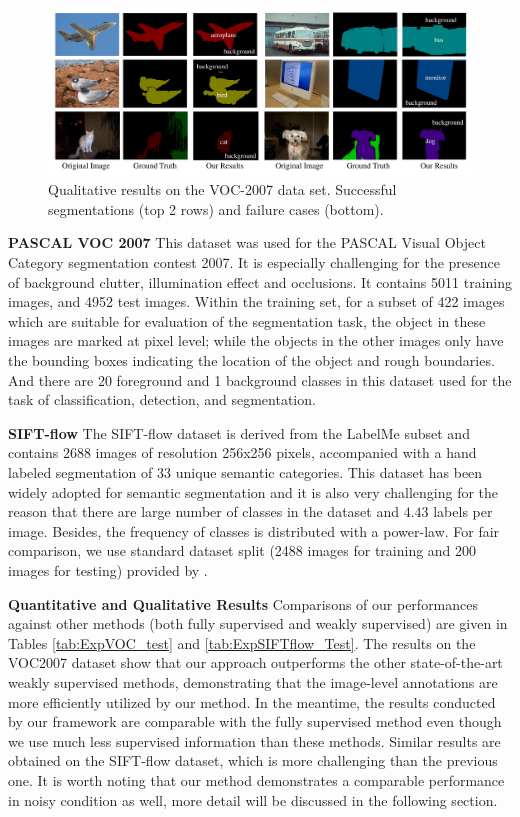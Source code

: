 \begin{figure}
\begin{center}
    \includegraphics[width=0.9\linewidth]{Fig_VOC.pdf}
\end{center}
\caption{Qualitative results on the VOC-2007 data set. Successful segmentations (top 2 rows) and failure cases (bottom).}
\label{fig:VOC-2007}
\end{figure}

\textbf{PASCAL VOC 2007}
This dataset was used for the PASCAL Visual Object Category segmentation contest 2007. It is especially challenging for the presence of background clutter, illumination effect and occlusions. It contains 5011 training images, and 4952 test images. Within the training set, for a subset of 422 images which are suitable for evaluation of the segmentation task, the object in these images are marked at pixel level; while the objects in the other images only have the bounding boxes indicating the location of the object and rough boundaries. And there are 20 foreground and 1 background classes in this dataset used for the task of classification, detection, and segmentation.

\textbf{SIFT-flow} The SIFT-flow dataset\cite{liu2011nonparametric} is derived from the LabelMe subset and contains 2688 images of resolution 256x256 pixels, accompanied with a hand labeled segmentation of 33 unique semantic categories. This dataset has been widely adopted for semantic segmentation and it is also very challenging for the reason that there are large number of classes in the dataset and $4.43$ labels per image. Besides, the frequency of classes is distributed with a power-law. For fair comparison, we use standard dataset split (2488 images for training and 200 images for testing) provided by \cite{liu2011nonparametric}.

\textbf{Quantitative and Qualitative Results} Comparisons of our performances against other methods (both fully supervised and weakly supervised) are given in Tables \ref{tab:ExpVOC_test} and \ref{tab:ExpSIFTflow_Test}. The results on the VOC2007 dataset show that our approach outperforms the other state-of-the-art weakly supervised methods, demonstrating that the image-level annotations are more efficiently utilized by our method. In the meantime, the results conducted by our framework are comparable with the fully supervised method even though we use much less supervised information than these methods. Similar results are obtained on the SIFT-flow dataset, which is more challenging than the previous one. It is worth noting that our method demonstrates a comparable performance in noisy condition as well, more detail will be discussed in the following section.

